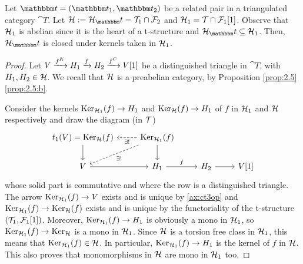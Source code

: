 \begin{lemma}\label{lem:thm:2.9}
  Let $\t= (\t_1,\t_2)$ be a related pair in a triangulated category $\cat{T}$. Let $\clH:=\clH_\t=\T_1\cap \F_2$ and $\mathcal{H}_1=\mathcal{T}\cap \mathcal{F}_1[1]$. Observe that $\mathcal{H}_1$ is abelian since it is the heart of a t-structure and $\clH_\t\subseteq \clH_1$. Then, $\clH_\t$ is closed under kernels taken in $\mathcal{H}_1$.
\end{lemma}
\begin{proof}
  Let $V\xrightarrow{f^K}H_1\xrightarrow{f}H_2\xrightarrow{f^C}V[1]$ be a distinguished triangle in $\cat{T}$, with $H_1,H_2\in\mathcal{H}$. We recall that $\mathcal{H}$ is a preabelian category, by Proposition \ref{prop:2.5}\ref{prop:2.5:b}.

  Consider the kernels $\operatorname{Ker}_{\mathcal{H}_1}(f)\to H_1$ and $\operatorname{Ker}_{\mathcal{H}}(f)\to H_1$ of $f$ in $\mathcal{H}_1$ and $\mathcal{H}$ respectively and draw the diagram (in $\mathcal{T}$)
  \begin{equation*}
    \begin{tikzcd}
      t_1(V)=\Ker_\clH(f)\arrow{d}
      & \Ker_{\clH_1}(f)\arrow{d}\arrow[dashed]{dl}{\exists !}\arrow[dashed]{l}{\exists !}
        & &\\
      V\arrow{r}
      & H_1\arrow{r}{f}
      & H_2\arrow{r}
      & V[1]
    \end{tikzcd}
  \end{equation*}
  whose solid part is commutative and where the row is a distinguished triangle. The arrow $\operatorname{Ker}_{\mathcal{H}_1}(f)\to V$ exists and is unique by \ref{ax:ct3op} and $\operatorname{Ker}_{\mathcal{H}_1}(f)\to \operatorname{Ker}_{\mathcal{H}}(f)$ exists and is unique by the functoriality of the t-structure $(\mathcal{T}_1,\mathcal{F}_1[1])$. Moreover, $\operatorname{Ker}_{\mathcal{H}_1}(f) \to H_1$ is obviously a mono in $\mathcal{H}_1$, so $\operatorname{Ker}_{\mathcal{H}_1}(f)\to \operatorname{Ker}_{\mathcal{H}}$ is a mono in $\mathcal{H}_1$. Since $\mathcal{H}$ is a torsion free class in $\mathcal{H}_1$, this means that $\operatorname{Ker}_{\mathcal{H}_1}(f)\in\mathcal{H}$. In particular, $\operatorname{Ker}_{\mathcal{H}_1}(f)\to H_1$ is the kernel of $f$ in $\mathcal{H}$. This also proves that monomorphisms in $\mathcal{H}$ are mono in $\mathcal{H}_1$ too.
\end{proof}


